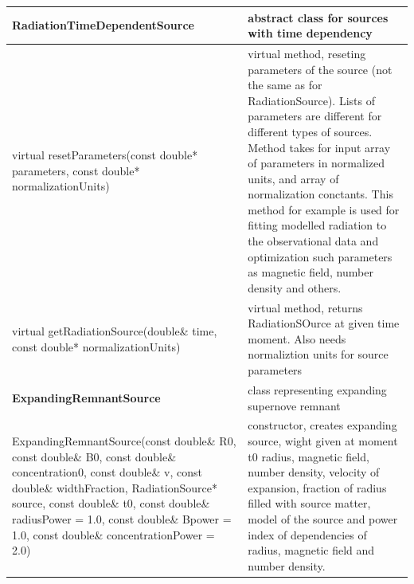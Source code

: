 \begin{small}
	\label{sourceTimeDependentMethods1}
	\begin{xtabular}{|p{0.5\textwidth}|p{0.5\textwidth}|}
		\hline
		\textbf{RadiationTimeDependentSource} & abstract class for sources with time dependency\\
		\hline
		virtual resetParameters(const double* parameters, const double* normalizationUnits) & virtual method, reseting parameters of the source (not the same as for RadiationSource). Lists of parameters are different for different types of sources. Method takes for input array of parameters in normalized units, and array of normalization conctants. This method for example is used for fitting modelled radiation to the observational data and optimization such parameters as magnetic field, number density and others.\\
		\hline
		virtual getRadiationSource(double\& time, const double* normalizationUnits) & virtual method, returns RadiationSOurce at given time moment. Also needs normaliztion units for source parameters \\
		\hline
		\textbf{ExpandingRemnantSource} & class representing expanding supernove remnant\\
		\hline
		ExpandingRemnantSource(const double\& R0, const double\& B0, const double\& concentration0, const double\& v, const double\& widthFraction, RadiationSource* source, const double\& t0, const double\& radiusPower = 1.0, const double\& Bpower = 1.0, const double\& concentrationPower = 2.0) & constructor, creates expanding source, wight given at moment t0 radius, magnetic field, number density, velocity of expansion, fraction of radius filled with source matter, model of the source and power index of dependencies of radius, magnetic field and number density.\\
		\hline
	\end{xtabular}
\end{small}
